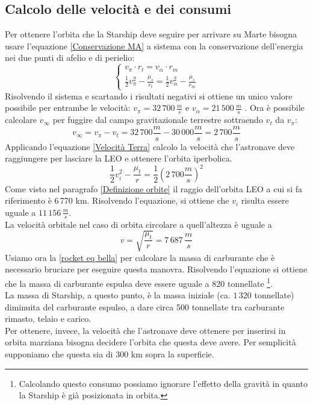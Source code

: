 \subsection{Calcolo delle velocità e dei consumi}
Per ottenere l'orbita che la Starship deve seguire per arrivare su Marte bisogna usare l'equazione \ref{Conservazione MA} a sistema con la conservazione dell'energia nei due punti di afelio e di perielio:
\begin{equation}
    \begin{cases}
        v_\pi \cdot r_t = v_\alpha \cdot r_m\\
        \frac{1}{2}v_\pi^2 - \frac{\mu_s}{r_t} = \frac{1}{2}v_\alpha^2 - \frac{\mu_s}{r_m}
    \end{cases}
\end{equation}
Risolvendo il sistema e scartando i risultati negativi si ottiene un unico valore possibile per entrambe le velocità: $v_\pi = 32\,700\,\frac{m}{s}$ e $v_\alpha = 21\,500
\,\frac{m}{s}$ . Ora è possibile calcolare $v_\infty$ per fuggire dal campo gravitazionale terrestre sottraendo $v_t$ da $v_\pi$:
$$
v_\infty = v_\pi - v_t = 32\,700 \frac{m}{s} - 30\,000 \frac{m}{s} = 2\,700 \frac{m}{s}
$$
Applicando l'equazione \ref{Velocità Terra} calcolo la velocità che l'astronave deve raggiungere per lasciare la LEO e ottenere l'orbita iperbolica.
$$
\frac{1}{2}v_i^2 - \frac{\mu_t}{r} = \frac{1}{2}\left(2\,700 \frac{m}{s}\right)^2
$$
Come visto nel paragrafo \ref{Definizione orbite} il raggio dell'orbita LEO a cui si fa riferimento è 6\,770 km.
Risolvendo l'equazione, si ottiene che $v_i$ risulta essere uguale a $11\,156\,\frac{m}{s}$.\\
La velocità orbitale nel caso di orbita circolare a quell'altezza è uguale a
$$
v = \sqrt{\frac{\mu_t}{r}} = 7\,687\,\frac{m}{s}
$$
Usiamo ora la \ref{rocket eq bella} per calcolare la massa di carburante che è necessario bruciare per eseguire questa manovra.
Risolvendo l'equazione si ottiene che la massa di carburante espulsa deve essere uguale a 820 tonnellate \footnote{Calcolando questo consumo possiamo ignorare l'effetto della gravità in quanto la Starship è già posizionata in orbita.}.\\
La massa di Starship, a questo punto, è la massa iniziale (ca. $1\,320$ tonnellate) diminuita del carburante espulso, a dare circa 500 tonnellate tra carburante rimasto, telaio e carico.\\
Per ottenere, invece, la velocità che l'astronave deve ottenere per inserirsi in orbita marziana bisogna decidere l'orbita che questa deve avere. Per semplicità supponiamo che questa sia di 300 km sopra la superficie.\\
